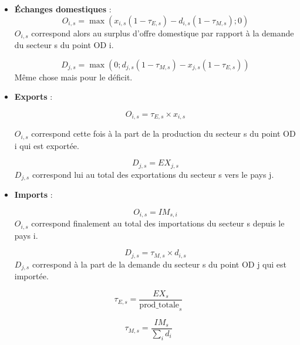 \documentclass[12pt,a4paper,french]{report}
\begin{document}
	\begin{itemize}
		\item \textbf{Échanges domestiques} :
		\begin{equation}
			O_{i,s} = \max (x_{i,s}(1-\tau_{E,s})-d_{i,s}(1-\tau_{M,s});0)
		\end{equation}
		$O_{i,s}$ correspond alors au surplus d'offre domestique par rapport à la demande du secteur s du point OD i.
		\medskip
	
		\begin{equation}
	 		D_{j,s} = \max (0; d_{j,s}(1-\tau_{M,s})-x_{j,s}(1-\tau_{E,s})) 
		\end{equation}
		Même chose mais pour le déficit.
		\medskip
		
		
		\item \textbf{Exports} : 

			\begin{equation}
				O_{i,s} = \tau_{E,s} \times x_{i,s}
			\end{equation}
			
			$O_{i,s}$ correspond cette fois à la part de la production du secteur s du point OD i qui est exportée.
			 
			 \begin{equation}
			 	D_{j,s} = EX_{j,s}
			 \end{equation}
			$D_{j,s}$ correspond lui au total des exportations du secteur s vers le pays j.
			\medskip
			 

		\item \textbf{Imports} :
			
			\begin{equation}
				O_{i,s} = IM_{s,i}
			\end{equation}
			$O_{i,s}$ correspond finalement au total des importations du secteur s depuis le pays i.
			 
			\begin{equation}
				D_{j,s} = \tau_{M,s}\times d_{i,s}
			\end{equation}
			$D_{j,s}$ correspond à la part de la demande du secteur s du point OD j qui est importée.

	\end{itemize}
	
	\begin{equation}
		\tau_{E,s} = \frac{EX_s}{\text{prod\_totale}_s}
	\end{equation}
	
	\begin{equation}
		\tau_{M,s}=\frac{IM_s}{\sum_i d_i}
	\end{equation}
	
\end{document}

